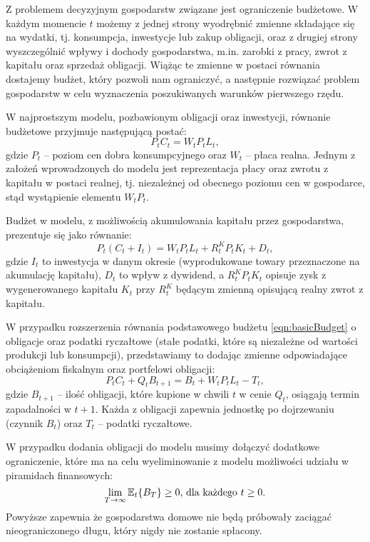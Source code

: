 Z problemem decyzyjnym gospodarstw związane jest ograniczenie budżetowe. W każdym momencie $t$ możemy z jednej strony wyodrębnić zmienne składające się na wydatki, tj. konsumpcja, inwestycje lub zakup obligacji, oraz z drugiej strony  wyszczególnić wpływy i dochody gospodarstwa, m.in. zarobki z pracy, zwrot z kapitału oraz sprzedaż obligacji. Wiążąc te zmienne w postaci równania dostajemy budżet, który pozwoli nam ograniczyć, a następnie rozwiązać problem gospodarstw w celu wyznaczenia poszukiwanych warunków pierwszego rzędu.

W najprostszym modelu, pozbawionym obligacji oraz inwestycji, równanie budżetowe przyjmuje następującą postać:
\begin{equation}
    \label{eqn:basicBudget}
    P_t C_t = W_t P_t L_t,
\end{equation}
gdzie $P_t$ -- poziom cen dobra konsumpcyjnego oraz $W_t$ -- płaca realna. Jednym z założeń wprowadzonych do modelu jest reprezentacja płacy oraz zwrotu z kapitału w postaci realnej, tj. niezależnej od obecnego poziomu cen w gospodarce, stąd wystąpienie elementu $W_t P_t$. 

Budżet w modelu, z możliwością akumulowania kapitału przez gospodarstwa, prezentuje się jako równanie:
\begin{equation}
    \label{eq:budget_dividend}
    P_t (C_t + I_t) = W_t P_t L_t + R^K_t P_t K_t + D_t,
\end{equation}
gdzie $I_t$ to inwestycja w danym okresie (wyprodukowane towary przeznaczone na akumulację kapitału), $D_t$ to wpływ z dywidend, a $R^K_t P_t K_t$ opisuje zysk z wygenerowanego kapitału $K_t$ przy $R^K_t$ będącym zmienną opisującą realny zwrot z kapitału.

W przypadku rozszerzenia równania podstawowego budżetu \eqref{eqn:basicBudget} o obligacje oraz podatki ryczałtowe (stałe podatki, które są niezależne od wartości produkcji lub konsumpcji), przedstawiamy to dodając zmienne odpowiadające obciążeniom fiskalnym oraz portfelowi obligacji:
\begin{equation}
    P_t C_t + Q_t B_{t+1} = B_{t} + W_t P_t L_t - T_t,
\end{equation}
gdzie $B_{t+1}$ -- ilość obligacji, które kupione w chwili $t$ w cenie $Q_t$, osiągają termin zapadalności w $t+1$. Każda z obligacji zapewnia jednostkę po dojrzewaniu (czynnik $B_{t}$) oraz $T_t$ -- podatki ryczałtowe.

W przypadku dodania obligacji do modelu musimy dołączyć dodatkowe ograniczenie, które ma na celu wyeliminowanie z modelu możliwości udziału w piramidach finansowych:
\begin{equation}
    \lim_{T\to\infty} \mathbb{E}_t\{B_T\} \geq 0 \text{, dla każdego } t \ge 0.
\end{equation}
Powyższe zapewnia że gospodarstwa domowe nie będą próbowały zaciągać nieograniczonego długu, który nigdy nie zostanie spłacony.

